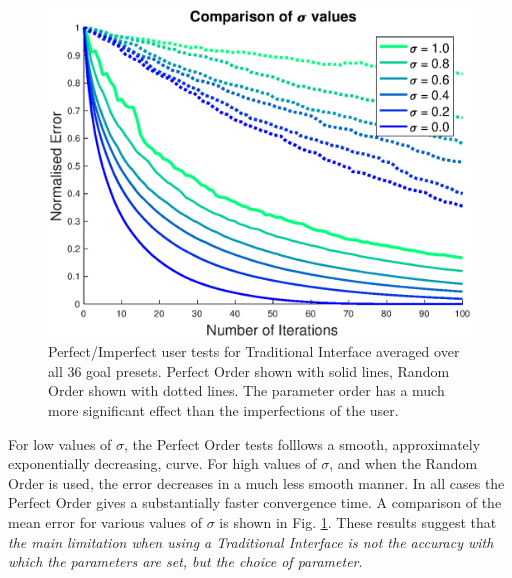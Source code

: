 \documentclass[11pt, oneside]{report}   	%
\begin{document}
\begin{figure}[h]
	\centering
	\includegraphics[width = 5in]{TradInterfaceTests2.eps}
	\caption{Perfect/Imperfect user tests for Traditional Interface averaged over all 36 goal presets. Perfect Order shown with solid lines, Random Order shown with dotted lines. The parameter order has a much more significant effect than the imperfections of the user.}
	\label{fig:TradTest2}
		\vspace{-10pt}
\end{figure}
For low values of $\sigma$, the Perfect Order tests folllows a smooth, approximately exponentially decreasing, curve. For high values of $\sigma$, and when the Random Order is used, the error decreases in a much less smooth manner. In all cases the Perfect Order gives a substantially faster convergence time. A comparison of the mean error for various values of $\sigma$ is shown in Fig. \ref{fig:TradTest2}. These results suggest that \emph{the main limitation when using a Traditional Interface is not the accuracy with which the parameters are set, but the choice of parameter}.
\vspace{-30pt}
%
\end{document}
